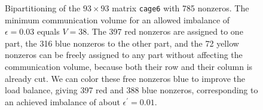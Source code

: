 \begin{figure}[htbp]
\label{fig:cage6}
  \centering
  \caption{Bipartitioning of the $93 \times 93 $ matrix \texttt{cage6} with 785 nonzeros.
The minimum communication volume for an allowed imbalance of $\epsilon=0.03$ equals $V=38$. 
The 397 red nonzeros are assigned to one part, the 316 blue nonzeros to the other part,
and the 72 yellow nonzeros can be freely assigned to any part without affecting
the communication volume, because both their row and their column is already cut.
We can color these free nonzeros blue to improve the load balance, giving 397 red and 388 blue nonzeros,
corresponding to an achieved imbalance of about $\epsilon^{\prime}=0.01$.}
\end{figure} 
